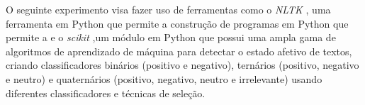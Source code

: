 O seguinte experimento visa fazer uso de ferramentas como o \textit{NLTK} \cite{bird2006nltk}, uma ferramenta em Python que permite a construção de programas em Python que permite a  e o \textit{scikit} \cite{pedregosa2011scikit},um módulo em Python que possui uma ampla gama de algoritmos de aprendizado de máquina para detectar o estado afetivo de textos, criando classificadores binários (positivo e negativo), ternários (positivo, negativo e neutro) e quaternários (positivo, negativo, neutro e irrelevante) usando diferentes classificadores e técnicas de seleção.